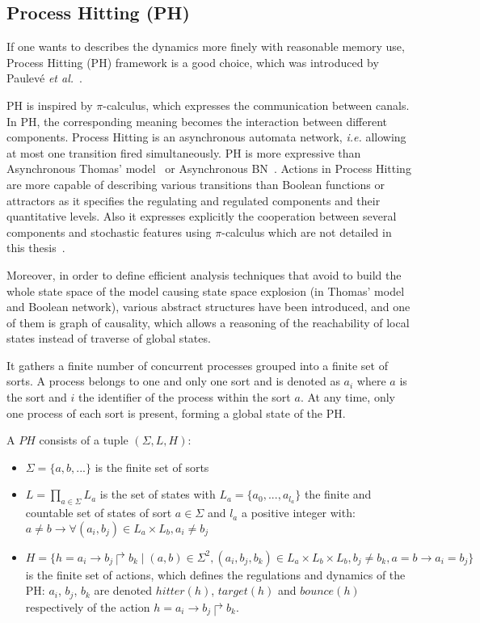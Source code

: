 \subsection{Process Hitting (PH)}
If one wants to describes the dynamics more finely with reasonable memory use, Process Hitting (PH) framework is a good choice, which was %
introduced by Paulev\'e \textit{et al.}~\cite{pauleve2011}.

PH is inspired by $\pi$-calculus, which expresses the communication between canals. 
In PH, the corresponding meaning becomes the interaction between different components.
Process Hitting is an asynchronous automata network, \textit{i.e.} allowing at most one transition fired simultaneously. 
PH is more expressive than Asynchronous Thomas' model~\cite{thomas1978} or Asynchronous BN~\cite{glass1975classification}. %
Actions in Process Hitting are more capable of describing various transitions than Boolean functions or attractors as it specifies the regulating and regulated components and their quantitative levels.
Also it expresses explicitly the cooperation between several components and stochastic features using $\pi$-calculus which are not detailed in this thesis~\cite{pauleve2014}.

Moreover, in order to define efficient analysis techniques that avoid to build the whole state space of the model causing state space explosion (in Thomas' model and Boolean network), various abstract structures have been introduced, and one of them is graph of causality, which allows a reasoning of the reachability of local states instead of traverse of global states.

It gathers a finite number of concurrent processes grouped into a finite set of sorts. A process belongs to one and only one sort and is denoted as $a_i$ where $a$ is the sort and $i$ the identifier of the process within the sort $a$.
At any time, only one process of each sort is present, forming a global state of the PH.

\begin{definition}
A $PH$ consists of a tuple $(\Sigma, L, H)$:
\begin{itemize}
    \item $\Sigma=\{a,b,...\}$ is the finite set of sorts
    \item $L=\prod_{a\in\Sigma}{L_a}$ is the set of states with $L_a=\{a_0,...,a_{l_a}\}$ the finite and countable set of states of sort $a\in\Sigma$ and $l_a$ a positive integer with: $a\neq b\to \forall(a_i,b_j)\in L_a\times L_b,a_i\neq b_j$
    \item $H=\{h=a_i\to b_j\Rsh b_k\mid(a,b)\in\Sigma^2, (a_i,b_j,b_k)\in L_a\times L_b\times L_b,b_j\neq b_k, a=b\to a_i=b_j\}$ is the finite set of actions, which defines the regulations and dynamics of the PH: $a_i$, $b_j$, $b_k$ are denoted $hitter(h)$, $target(h)$ and $bounce(h)$ respectively of the action $h=a_i\to b_j\Rsh b_k$.
\end{itemize}
\end{definition}

